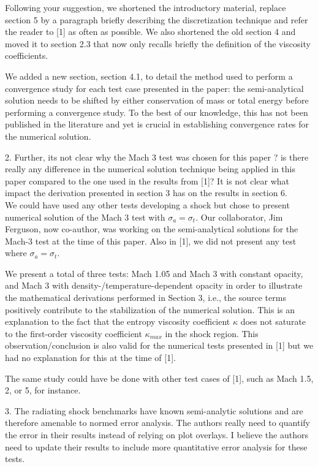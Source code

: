 \documentclass{article}
\begin{document}
Following your suggestion, we shortened the introductory material, replace section 5 by a paragraph briefly describing the discretization technique and refer the reader to [1] as often as possible. We also shortened the old section 4 and moved it to section 2.3 that now only recalls briefly the definition of the viscosity coefficients. 

We added a new section, section 4.1, to detail the method used to perform a convergence study for each test case presented in the paper: the semi-analytical solution needs to be shifted by either conservation of mass or total energy before performing a convergence study. To the best of our knowledge, this has not been published in the literature and yet is crucial in
establishing convergence rates for the numerical solution.  
\bigskip

{\color{blue}
2. Further, its not clear why the Mach 3 test was chosen for this paper ? is there really any difference in the numerical solution technique being applied in this paper compared to the one used in the results from [1]? It is not clear what impact the derivation presented in section 3 has on the results in section 6.\\}
We could have used any other tests developing a shock but chose to present numerical solution of the Mach 3 test with $\sigma_a = \sigma_t$. Our collaborator, Jim Ferguson, now co-author, was working on the semi-analytical solutions for the Mach-3 test at the time of this paper. Also in [1], we did not present any test where $\sigma_a = \sigma_t$. 

We present a total of three tests: Mach 1.05 and Mach 3 with constant opacity, and Mach 3 with density-/temperature-dependent opacity in order to illustrate the mathematical derivations performed in Section 3, i.e., the source terms positively contribute to the stabilization of the numerical solution. This is an explanation to the fact that the entropy viscosity coefficient $\kappa$ does not saturate to the first-order viscosity coefficient $\kappa_{max}$ in the shock region. This observation/conclusion is also valid for the numerical tests presented in [1] but we had no explanation for this at the time of [1].

The same study could have be done with other test cases of [1], such as Mach 1.5, 2, or 5, for instance. 
\bigskip

{\color{blue}
3. 
The radiating shock benchmarks have known semi-analytic solutions and are therefore amenable to normed error analysis. The authors really need to quantify the error in their results instead of relying on plot overlays. I believe the authors need to update their results to include more quantitative error analysis for these tests.
\\}
\end{document}
